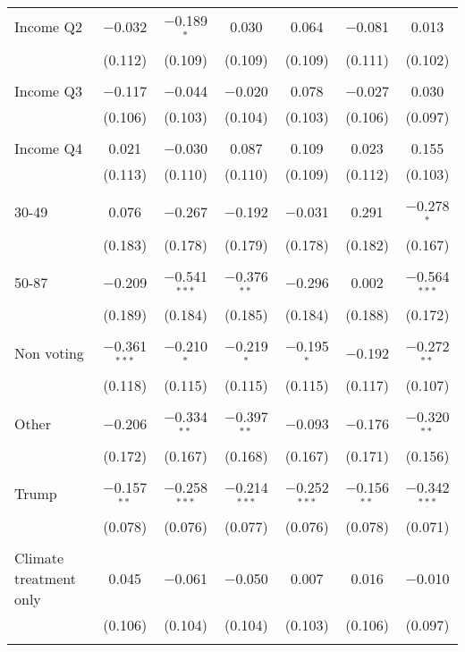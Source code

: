 \begin{tabular}{@{\extracolsep{5pt}}lcccccc}
 Income Q2 & $-$0.032 & $-$0.189$^{*}$ & 0.030 & 0.064 & $-$0.081 & 0.013 \\ 
  & (0.112) & (0.109) & (0.109) & (0.109) & (0.111) & (0.102) \\ 
  & & & & & & \\ 
 Income Q3 & $-$0.117 & $-$0.044 & $-$0.020 & 0.078 & $-$0.027 & 0.030 \\ 
  & (0.106) & (0.103) & (0.104) & (0.103) & (0.106) & (0.097) \\ 
  & & & & & & \\ 
 Income Q4 & 0.021 & $-$0.030 & 0.087 & 0.109 & 0.023 & 0.155 \\ 
  & (0.113) & (0.110) & (0.110) & (0.109) & (0.112) & (0.103) \\ 
  & & & & & & \\ 
 30-49 & 0.076 & $-$0.267 & $-$0.192 & $-$0.031 & 0.291 & $-$0.278$^{*}$ \\ 
  & (0.183) & (0.178) & (0.179) & (0.178) & (0.182) & (0.167) \\ 
  & & & & & & \\ 
 50-87 & $-$0.209 & $-$0.541$^{***}$ & $-$0.376$^{**}$ & $-$0.296 & 0.002 & $-$0.564$^{***}$ \\ 
  & (0.189) & (0.184) & (0.185) & (0.184) & (0.188) & (0.172) \\ 
  & & & & & & \\ 
 Non voting & $-$0.361$^{***}$ & $-$0.210$^{*}$ & $-$0.219$^{*}$ & $-$0.195$^{*}$ & $-$0.192 & $-$0.272$^{**}$ \\ 
  & (0.118) & (0.115) & (0.115) & (0.115) & (0.117) & (0.107) \\ 
  & & & & & & \\ 
 Other & $-$0.206 & $-$0.334$^{**}$ & $-$0.397$^{**}$ & $-$0.093 & $-$0.176 & $-$0.320$^{**}$ \\ 
  & (0.172) & (0.167) & (0.168) & (0.167) & (0.171) & (0.156) \\ 
  & & & & & & \\ 
 Trump & $-$0.157$^{**}$ & $-$0.258$^{***}$ & $-$0.214$^{***}$ & $-$0.252$^{***}$ & $-$0.156$^{**}$ & $-$0.342$^{***}$ \\ 
  & (0.078) & (0.076) & (0.077) & (0.076) & (0.078) & (0.071) \\ 
  & & & & & & \\ 
 Climate treatment only & 0.045 & $-$0.061 & $-$0.050 & 0.007 & 0.016 & $-$0.010 \\ 
  & (0.106) & (0.104) & (0.104) & (0.103) & (0.106) & (0.097) \\ 
  & & & & & & \\ 

\end{tabular}
